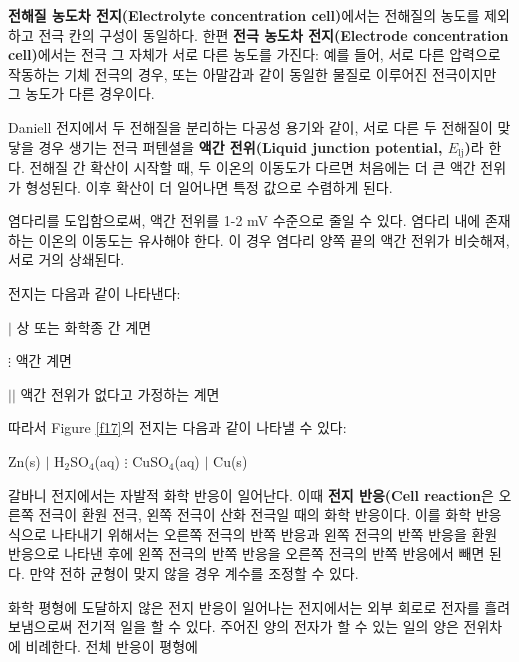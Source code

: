         \textbf{전해질 농도차 전지(Electrolyte concentration cell)}에서는 전해질의 농도를 제외하고 전극 칸의 구성이 동일하다. 한편 
        \textbf{전극 농도차 전지(Electrode concentration cell)}에서는 전극 그 자체가 서로 다른 농도를 가진다: 예를 들어, 서로 다른 압력으로 작동하는 
        기체 전극의 경우, 또는 아말감과 같이 동일한 물질로 이루어진 전극이지만 그 농도가 다른 경우이다. 
        \par Daniell 전지에서 두 전해질을 분리하는 다공성 용기와 같이, 서로 다른 두 전해질이 맞닿을 경우 생기는 전극 퍼텐셜을 \textbf{액간 전위(Liquid junction potential, $E_\mathrm{lj}$)}라 
        한다. 전해질 간 확산이 시작할 때, 두 이온의 이동도가 다르면 처음에는 더 큰 액간 전위가 형성된다. 
        이후 확산이 더 일어나면 특정 값으로 수렴하게 된다. 
        \par 염다리를 도입함으로써, 액간 전위를 1-2 mV 수준으로 줄일 수 있다. 염다리 내에 존재하는 이온의 
        이동도는 유사해야 한다. 이 경우 염다리 양쪽 끝의 액간 전위가 비슷해져, 서로 거의 상쇄된다.
        \par 전지는 다음과 같이 나타낸다:
        \begin{defn}
        \begin{enum}
            \item $\vert$ 상 또는 화학종 간 계면
            \item $\vdots$ 액간 계면
            \item $\vert \vert$ 액간 전위가 없다고 가정하는 계면
        \end{enum}
        \end{defn}
        따라서 Figure \ref{f17}의 전지는 다음과 같이 나타낼 수 있다:
        \begin{center}
            Zn(s) $\vert$ H$_2$SO$_4$(aq) $\vdots$ CuSO$_4$(aq) $\vert$ Cu(s)
        \end{center}
        \par 갈바니 전지에서는 자발적 화학 반응이 일어난다. 이때 \textbf{전지 반응(Cell reaction}은 
        오른쪽 전극이 환원 전극, 왼쪽 전극이 산화 전극일 때의 화학 반응이다. 이를 화학 반응식으로 나타내기 위해서는 오른쪽 전극의 반쪽 반응과 왼쪽 전극의 반쪽 반응을 환원 반응으로 나타낸 후에 왼쪽 전극의 반쪽 반응을 
        오른쪽 전극의 반쪽 반응에서 빼면 된다. 만약 전하 균형이 맞지 않을 경우 계수를 조정할 수 있다.
        \par 화학 평형에 도달하지 않은 전지 반응이 일어나는 전지에서는 외부 회로로 전자를 흘려보냄으로써 
        전기적 일을 할 수 있다. 주어진 양의 전자가 할 수 있는 일의 양은 전위차에 비례한다. 전체 반응이 평형에 
